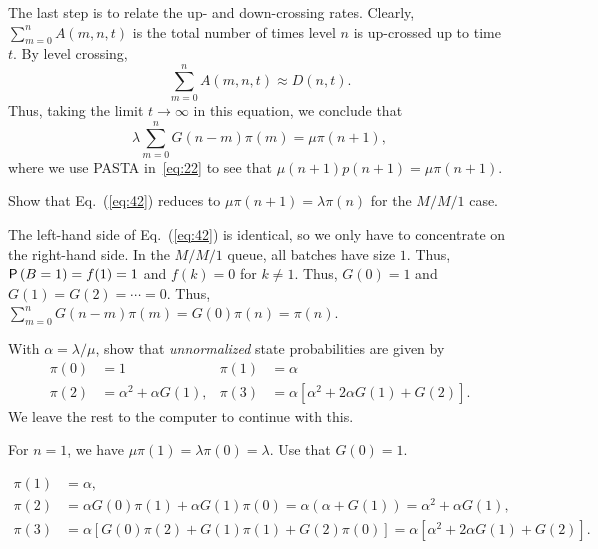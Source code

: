 The last step is to relate the up- and down-crossing rates.  Clearly, $\sum_{m=0}^n A(m,n,t)$ is  the total number of times level $n$ is up-crossed up to time~$t$. By level crossing,
 \begin{equation*}
 \sum_{m=0}^n A(m,n,t) \approx  D(n,t). 
\end{equation*}
Thus, taking the limit $t\to\infty$ in this equation, we conclude that
\begin{equation}\label{eq:42}
\lambda  \sum_{m=0}^n G(n-m) \pi(m) = \mu \pi(n+1),
\end{equation}
where we use  PASTA in~\eqref{eq:22} to see that $\mu(n+1)p(n+1) = \mu \pi(n+1)$. 

\begin{exercise}[\faFlask]
  Show that Eq.~(\ref{eq:42}) reduces to $\mu \pi(n+1)=\lambda \pi(n)$ for the $M/M/1$ case.
  \begin{solution}
    The left-hand side of Eq.~(\ref{eq:42}) is identical, so we only
    have to concentrate on the right-hand side. In the $M/M/1$ queue,
    all batches have size $1$. Thus, $\P{B=1} = f(1)=1$ and $f(k)=0$
    for $k\neq 1$. Thus, $G(0)=1$ and $G(1)=G(2)=\cdots = 0$. Thus,
    $\sum_{m=0}^n G(n-m) \pi(m) = G(0)\pi(n)=\pi(n)$.
  \end{solution}
\end{exercise}

\begin{exercise}[\faCalculator]\label{ex:13}
With $\alpha = \lambda/\mu$,  show that \emph{unnormalized} state probabilities are given by
\begin{align*}
\pi(0) & = 1 &
  \pi(1) &= \alpha \\
  \pi(2) &= \alpha^2 + \alpha G(1), &
  \pi(3) &= \alpha[ \alpha^2 + 2 \alpha G(1) + G(2)].
\end{align*}
We leave the rest to the computer to continue with this.
\begin{hint}
For $n=1$, we have
$\mu \pi(1) = \lambda \pi(0)=\lambda$. Use that $G(0)=1$.
\end{hint}
\begin{solution}
\begin{equation*}
  \begin{split}
  \pi(1) &= \alpha, \\
  \pi(2) &= \alpha G(0) \pi(1) + \alpha G(1) \pi(0) =\alpha(\alpha+ G(1)) = \alpha^2 + \alpha G(1), \\
  \pi(3) 
&= \alpha[G(0) \pi(2) + G(1) \pi(1) + G(2) \pi(0)]  = \alpha[ \alpha^2 + 2 \alpha G(1) + G(2)].
  \end{split}
\end{equation*}
\end{solution}  
\end{exercise}

